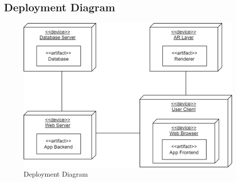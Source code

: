 	\subsection{Deployment Diagram}
		\begin{figure}[h!]
			\includegraphics[width=\textwidth]{components/images/deployment.png}
			\caption{Deployment Diagram}
			\label{fig:deployment}
		\end{figure}